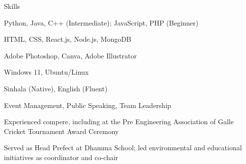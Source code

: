 \begin{rubric}{Skills}

    Python, Java, C++ (Intermediate); JavaScript, PHP (Beginner)

    HTML, CSS, React.js, Node.js, MongoDB

    Adobe Photoshop, Canva, Adobe Illustrator

    Windows 11, Ubuntu/Linux

\entry*[Languages]
    Sinhala (Native), English (Fluent)

    Event Management, Public Speaking, Team Leadership
    \par Experienced compere, including at the Pre Engineering Association of Galle Cricket Tournament Award Ceremony
    \par Served as Head Prefect at Dhamma School; led environmental and educational initiatives as coordinator and co-chair

\end{rubric}
